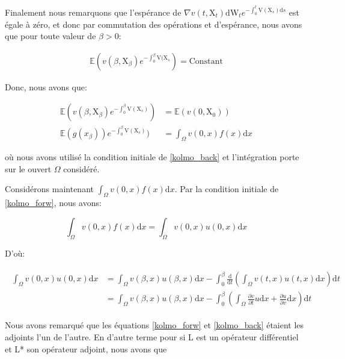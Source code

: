\documentclass[11pt]{article}
\theoremstyle{definition}
\theoremstyle{remark}
\begin{document}
Finalement nous remarquons que l’espérance de $\nabla v(t, \mathrm{X}_t)\mathrm{dW}_{t} e^{-\int_0^{t} \mathrm{V}(\mathrm{X}_{s}) \mathrm{d}s}$ est égale à zéro, et donc par commutation des opérations et d’espérance, nous avons que pour toute valeur de $\beta > 0$: 

\begin{align}
\mathbb{E}(v(\beta , \mathrm{X}_{\beta})e^{-\int_0^{\beta} \mathrm{V}(\mathrm{X}_{s}}) = \mathrm{Constant}
\end{align}

Donc, nous avons que: 

\begin{align}
\mathbb{E}(v(\beta , \mathrm{X}_{\beta})e^{-\int_0^{\beta} \mathrm{V}(\mathrm{X}_{s})}) &= \mathbb{E}(v(0, \mathrm{X}_0)) \\
\mathbb{E}(g(x_{\beta}))e^{-\int_0^{\beta} \mathrm{V}(\mathrm{X}_{s})}) &= \int_{\Omega} v(0,x) f(x) \mathrm{d}x
\end{align}

où nous avons utilisé la condition initiale de \eqref{kolmo_back} et l’intégration porte sur le ouvert $\Omega$ considéré. 

Considérons maintenant $\int_{\Omega} v(0,x) f(x) \mathrm{d}x$. Par la condition initiale de \eqref{kolmo_forw}, nous avons:

\begin{equation}
\int_{\Omega} v(0,x) f(x) \mathrm{d}x = \int_{\Omega} v(0,x) u(0,x) \mathrm{d}x
\end{equation}

D'où:

\begin{align}
\label{expansion_integral_vu}
\begin{split}
\int_{\Omega} v(0,x) u(0,x) \mathrm{d}x &= \int_{\Omega} v(\beta, x) u(\beta,x) \mathrm{d}x - \int_{0}^{\beta} \frac{\mathrm{d}}{\mathrm{d}t}\left(\int_{\Omega} v(t,x) u(t,x) \mathrm{d}x \right) \mathrm{d}t \\
&= \int_{\Omega} v(\beta, x) u(\beta,x) \mathrm{d}x - \int_{0}^{\beta} \left( \int_{\Omega} \frac{\partial v}{\partial t} u \mathrm{d}x + \frac{\partial u}{\partial v} \mathrm{d}x \right) \mathrm{d}t
\end{split}
\end{align}

Nous avons remarqué que les équations \eqref{kolmo_forw} et \eqref{kolmo_back} étaient les adjoints l'un de l'autre. En d'autre terme pour si L est un opérateur différentiel et L* son opérateur adjoint, nous avons que 
\end{document}

